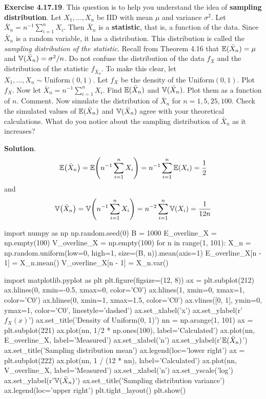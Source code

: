 \textbf{Exercise 4.17.19}. This question is to help you understand the
idea of \textbf{sampling distribution}. Let \(X_{1}, \dots, X_{n}\) be IID
with mean \(\mu\) and variance \(\sigma^{2}\). Let
\(\bar{X}_{n}  = n^{-1}\sum_{i=1}^{n} X_{i}\). Then \(\bar{X}_{n}\) is
a \textbf{statistic}, that is, a function of the data. Since
\(\bar{X}_{n}\) is a random variable, it has a distribution. This
distribution is called the \emph{sampling distribution of the
statistic}. Recall from Theorem 4.16 that
\(\operatorname{\mathbb{E}}(\bar{X}_{n}) = \mu\) and
\(\operatorname{\mathbb{V}}(\bar{X}_{n}) = \sigma^{2} / n\). Do not confuse the
distribution of the data \(f_X\) and the distribution of the statistic
\(f_{\bar{X}_{n}}\). To make this clear, let
\(X_{1}, \dots, X_{n} \sim \text{Uniform}(0, 1)\). Let \(f_X\) be the
density of the \(\text{Uniform}(0, 1)\). Plot \(f_X\). Now let
\(\bar{X}_{n} = n^{-1} \sum_{i=1}^{n} X_{i}\). Find
\(\operatorname{\mathbb{E}}(\bar{X}_{n})\) and \(\operatorname{\mathbb{V}}(\bar{X}_{n})\). Plot
them as a function of \(n\). Comment. Now simulate the distribution of
\(\bar{X}_{n}\) for \(n = 1, 5, 25, 100\). Check the simulated values
of \(\operatorname{\mathbb{E}}(\bar{X}_{n})\) and \(\operatorname{\mathbb{V}}(\bar{X}_{n})\)
agree with your theoretical calculations. What do you notice about the
sampling distribution of \(\bar{X}_{n}\) as it increases?

\textbf{Solution}.
\[
\EXP\left(\bar{X}_{n}\right) = \EXP\left(n^{-1} \sum_{i=1}^{n} X_{i} \right) = n^{-1} \sum_{i=1}^{n} \EXP(X_{i}) = \frac{1}{2}
\]
and
\[
\VAR\left(\bar{X}_{n}\right) = \VAR\left(n^{-1} \sum_{i=1}^{n} X_{i} \right) = n^{-2} \sum_{i=1}^{n} \VAR(X_{i}) = \frac{1}{12 n}
\]

\begin{python}
import numpy as np
np.random.seed(0)
B = 1000
E_overline_X = np.empty(100)
V_overline_X = np.empty(100)
for n in range(1, 101):
    X_n = np.random.uniform(low=0, high=1, size=(B, n)).mean(axis=1)
    E_overline_X[n - 1] = X_n.mean()
    V_overline_X[n - 1] = X_n.var()
\end{python}

\begin{python}
import matplotlib.pyplot as plt
plt.figure(figsize=(12, 8))
ax = plt.subplot(212)
ax.hlines(0, xmin=-0.5, xmax=0, color='C0')
ax.hlines(1, xmin=0, xmax=1, color='C0')
ax.hlines(0, xmin=1, xmax=1.5, color='C0')
ax.vlines([0, 1], ymin=0, ymax=1, color='C0', linestyle='dashed')
ax.set_xlabel('x')
ax.set_ylabel(r'$f_X(x)$')
ax.set_title('Density of Uniform(0, 1)')
nn = np.arange(1, 101)
ax = plt.subplot(221)
ax.plot(nn, 1/2 * np.ones(100), label='Calculated')
ax.plot(nn, E_overline_X, label='Measured')
ax.set_xlabel('n')
ax.set_ylabel(r'$\operatorname{\mathbb{E}}(\bar{X}_{n})$')
ax.set_title('Sampling distribution mean')
ax.legend(loc='lower right')
ax = plt.subplot(222)
ax.plot(nn, 1 / (12 * nn), label='Calculated')
ax.plot(nn, V_overline_X, label='Measured')
ax.set_xlabel('n')
ax.set_yscale('log')
ax.set_ylabel(r'$\operatorname{\mathbb{V}}(\bar{X}_{n})$')
ax.set_title('Sampling distribution variance')
ax.legend(loc='upper right')
plt.tight_layout()
plt.show()
\end{python}

